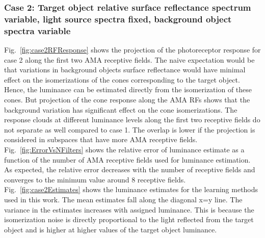 \documentclass{jov}
\begin{document}
\subsubsection{Case 2: Target object relative surface reflectance spectrum variable, light source spectra fixed, background object spectra variable}
Fig.~{\ref{fig:case2RFResponse}} shows the projection of the photoreceptor response for case 2 along the first two AMA receptive fields. The naive expectation would be that variations in background objects surface reflectance would have minimal effect on the isomerizations of the cones corresponding to the target object. Hence, the luminance can be estimated directly from the isomerization of these cones. But projection of the cone response along the AMA RFs shows that the background variation has significant effect on the cone isomerizations. The response clouds at different luminance levels along the first two receptive fields do not separate as well compared to case 1. The overlap is lower if the projection is considered in subspaces that have more AMA receptive fields. Fig.~\ref{fig:ErrorVsNFilters} shows the relative error of luminance estimate as a function of the number of AMA receptive fields used for luminance estimation. As expected, the relative error decreases with the number of receptive fields and converges to the minimum value around 8 receptive fields. Fig.~\ref{fig:case2Estimates} shows the luminance estimates for the learning methods used in this work. The mean estimates fall along the diagonal x=y line. The variance in the estimates increases with assigned luminance. This is because the isomerization noise is directly proportional to the light reflected from the target object and is higher at higher values of the target object luminance.
\end{document}
